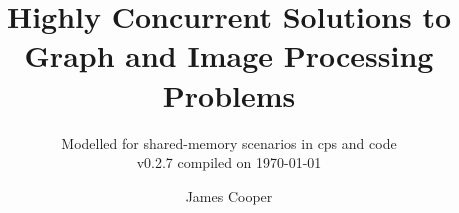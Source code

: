 \documentclass[newzealand,10pt,partial,onehalfspace]{aucklandthesis}
\theoremstyle{plain}
\begin{document}
\frontmatter

%
%
%

\title{Highly Concurrent Solutions to Graph and Image Processing Problems}
\subtitle{Modelled for shared-memory scenarios in \gls{cps} and code \\ {\small v0.2.7 compiled on \today}}
\author{James Cooper}

\maketitle




\cleardoublepage\tableofcontents
\cleardoublepage\listoffigures
\cleardoublepage\listoftables
\cleardoublepage\listofcprulesetfloats
\cleardoublepage\listofcpobjectsfloats
\cleardoublepage\listoffixmes
\cleardoublepage\printglossary
\cleardoublepage\printglossary[type=\acronymtype]

%
%
%
%

\mainmatter

\glsresetall

\glsresetall

\glsresetall

\glsresetall

\glsresetall

\glsresetall

\glsresetall

% 
% 
\glsresetall

\end{document}
